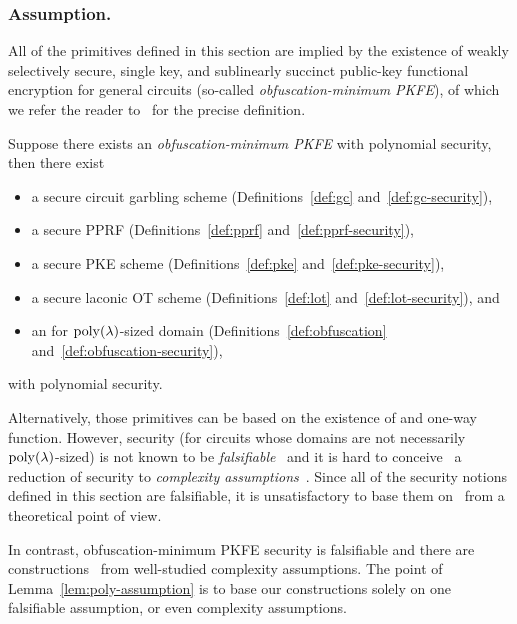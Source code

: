 \subsubsection{Assumption.}
All of the primitives defined in this section are implied by the existence of
weakly selectively secure, single key, and sublinearly succinct
public-key functional encryption for general circuits
(so-called \emph{obfuscation-minimum PKFE}),
of which we refer the reader to~\cite{C:KNTY19} for the precise definition.

\begin{lemma}\label{lem:poly-assumption}
Suppose there exists an \emph{obfuscation-minimum PKFE} with polynomial security, then there exist
\begingroup
{}
\begin{itemize}
\item {}
a secure circuit garbling scheme (Definitions~\ref{def:gc} and~\ref{def:gc-security}),
\item {}
a secure PPRF (Definitions~\ref{def:pprf} and~\ref{def:pprf-security}),
\item {}
a secure PKE scheme (Definitions~\ref{def:pke} and~\ref{def:pke-security}),
\item {}
a secure laconic OT scheme (Definitions~\ref{def:lot} and~\ref{def:lot-security}), and
\item {}
an {\iO} for $\operatorname{poly}(\lambda)$-sized domain (Definitions~\ref{def:obfuscation} and~\ref{def:obfuscation-security}),
\end{itemize}
with polynomial security.
\endgroup
\end{lemma}

\noindent
Alternatively, those primitives can be based on the existence of {\iO} and one-way function.
However, {\iO} security (for circuits whose domains are not necessarily $\operatorname{poly}(\lambda)$-sized) is not known to be \emph{falsifiable}~\cite{STOC:GenWic11} and it is hard to conceive~\cite{STOC:GGSW13} a reduction of {\iO} security to \emph{complexity assumptions}~\cite{TCC:GolKal16}.
Since all of the security notions defined in this section are falsifiable,
it is unsatisfactory to base them on~{\iO} from a theoretical point of view.

In contrast, obfuscation-minimum PKFE security is falsifiable and there are constructions~\cite{STOC:JaiLinSah21,EPRINT:JaiLinSah21corrected} from well-studied complexity assumptions.
The point of Lemma~\ref{lem:poly-assumption} is to base our constructions solely on one falsifiable assumption, or even complexity assumptions.
